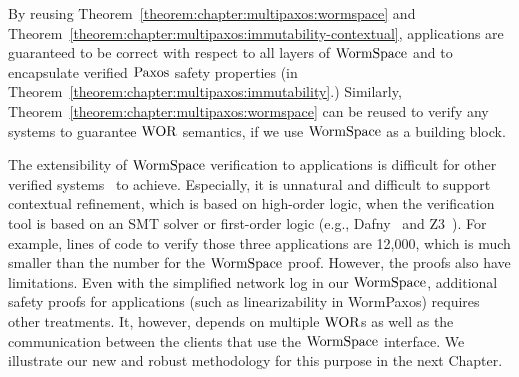 By reusing Theorem~\ref{theorem:chapter:multipaxos:wormspace} and Theorem~\ref{theorem:chapter:multipaxos:immutability-contextual},
applications are guaranteed to be correct with respect to all layers of $\mathrm{WormSpace}$ and
 to encapsulate verified $\mathrm{Paxos}$ safety properties (in Theorem~\ref{theorem:chapter:multipaxos:immutability}.)
 Similarly, Theorem~\ref{theorem:chapter:multipaxos:wormspace} can be reused to verify any systems to guarantee $\mathrm{WOR}$ semantics, 
if we use $\mathrm{WormSpace}$ as a building block. 
        
The extensibility of $\mathrm{WormSpace}$ verification to applications is difficult for other verified systems~\cite{ironfleet, hyperkernel} to achieve. 
Especially, it is unnatural and difficult to support contextual refinement, 
which is based on high-order logic, when the verification tool is based on an SMT solver or first-order logic (e.g., Dafny~\cite{dafny} 
and Z3~\cite{moura08}). 
For example, lines of code to verify those three applications are 12,000, which is much smaller than the number for the $\mathrm{WormSpace}$ proof. 
However, the proofs also have limitations. 
Even with the simplified network log in our $\mathrm{WormSpace}$, additional safety proofs for applications (such as linearizability in WormPaxos) 
requires other treatments. 
It, however, depends on multiple $\mathrm{WOR}$s as well as the communication between the clients that use the $\mathrm{WormSpace}$ interface. 
We illustrate our new and robust methodology for this purpose in the next Chapter.
